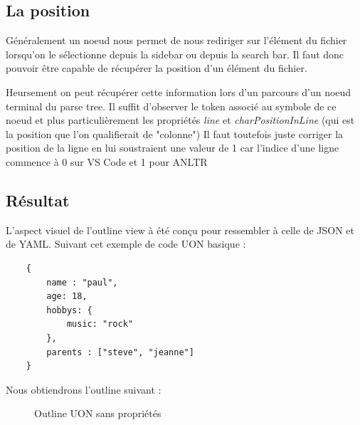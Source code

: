 \documentclass[
    iict, %
    il, %
]{heig-tb}
\begin{document}
\subsection{La position}

Généralement un noeud nous permet de nous rediriger sur l'élément du fichier lorsqu'on le sélectionne depuis la sidebar ou depuis la search bar. %
Il faut donc pouvoir être capable de récupérer la position d'un élément du fichier.

Heursement on peut récupérer cette information lors d'un parcours d'un noeud terminal du parse tree.
Il suffit d'observer le token associé au symbole de ce noeud et plus particulièrement les
propriétés \emph{line} et \emph{charPositionInLine} (qui est la position que l'on qualifierait de "colonne")
Il faut toutefois juste corriger la position de la ligne en lui soustraient une valeur de 1 car l'indice d'une ligne commence à 0 sur VS Code et 1 pour ANLTR %

\subsection{Résultat}
L'aspect visuel de l'outline view à été conçu pour ressembler à celle de JSON et de YAML.
Suivant cet exemple de code UON basique :

\begin{lstlisting}
    {
        name : "paul",
        age: 18,
        hobbys: {
            music: "rock"
        },
        parents : ["steve", "jeanne"]
    }
\end{lstlisting}

Nous obtiendrons l'outline suivant :

\begin{figure}[!h]
    \begin{center}
    \end{center}
    \caption[Outline UON sans propriétés]{\label{uon-payload-outline-without-properties} Outline UON sans propriétés}
\end{figure}
\end{document}
